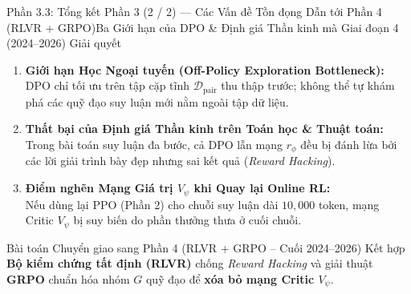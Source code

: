 \begin{frame}{Phần 3.3: Tổng kết Phần 3 (2 / 2) --- Các Vấn đề Tồn đọng Dẫn tới Phần 4 (RLVR + GRPO)}{Ba Giới hạn của DPO \& Định giá Thần kinh mà Giai đoạn 4 (2024--2026) Giải quyết}
  \small
  \begin{enumerate}\setlength{\itemsep}{6pt}
    \item \textbf{Giới hạn Học Ngoại tuyến (Off-Policy Exploration Bottleneck):}\\
      \footnotesize DPO chỉ tối ưu trên tập cặp tĩnh $\mathcal{D}_{\text{pair}}$ thu thập trước; không thể tự khám phá các quỹ đạo suy luận mới nằm ngoài tập dữ liệu.
    \item \textbf{Thất bại của Định giá Thần kinh trên Toán học \& Thuật toán:}\\
      \footnotesize Trong bài toán suy luận đa bước, cả DPO lẫn mạng $r_\phi$ đều bị đánh lừa bởi các lời giải trình bày đẹp nhưng sai kết quả (\textit{Reward Hacking}).
    \item \textbf{Điểm nghẽn Mạng Giá trị $V_\psi$ khi Quay lại Online RL:}\\
      \footnotesize Nếu dùng lại PPO (Phần 2) cho chuỗi suy luận dài $10{,}000$ token, mạng Critic $V_\psi$ bị suy biến do phần thưởng thưa ở cuối chuỗi.
  \end{enumerate}

  \vspace{0.06cm}
  \begin{exampleblock}{Bài toán Chuyển giao sang Phần 4 (RLVR + GRPO -- Cuối 2024--2026)}
    \footnotesize
    Kết hợp \textbf{Bộ kiểm chứng tất định (RLVR)} chống \textit{Reward Hacking} và giải thuật \textbf{GRPO} chuẩn hóa nhóm $G$ quỹ đạo để \textbf{xóa bỏ mạng Critic $V_\psi$}.
  \end{exampleblock}
\end{frame}

